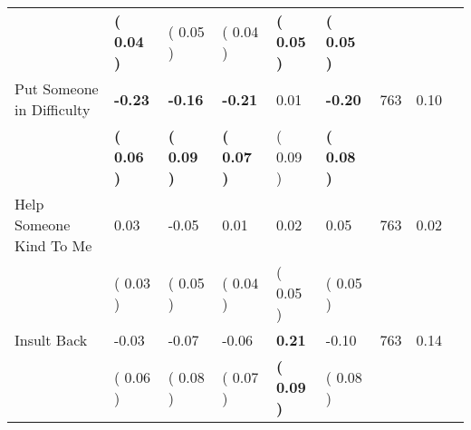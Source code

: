 \begin{tabular}{L{6.2cm} C{1.8cm} C{1.8cm} C{1.8cm} C{1.8cm} C{1.8cm} C{1.8cm} C{0.3cm} C{0.3cm}}
 & \textbf{(     0.04 )} & (     0.05 ) & (     0.04 ) & \textbf{(     0.05 )} & \textbf{(     0.05 )}  & \\
Put Someone in Difficulty & \textbf{    -0.23} & \textbf{    -0.16} & \textbf{    -0.21} &      0.01 & \textbf{    -0.20}  & 763 &       0.10 \\ 
 & \textbf{(     0.06 )} & \textbf{(     0.09 )} & \textbf{(     0.07 )} & (     0.09 ) & \textbf{(     0.08 )}  & \\
Help Someone Kind To Me &      0.03 &     -0.05 &      0.01 &      0.02 &      0.05  & 763 &       0.02 \\ 
 & (     0.03 ) & (     0.05 ) & (     0.04 ) & (     0.05 ) & (     0.05 )  & \\
Insult Back &     -0.03 &     -0.07 &     -0.06 & \textbf{     0.21} &     -0.10  & 763 &       0.14 \\ 
 & (     0.06 ) & (     0.08 ) & (     0.07 ) & \textbf{(     0.09 )} & (     0.08 )  & \\
\bottomrule
\end{tabular}

